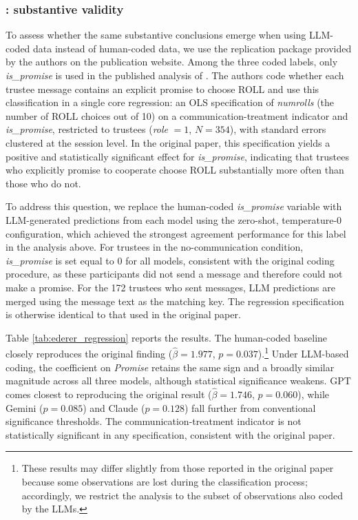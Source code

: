 \documentclass[11pt]{article}
\begin{document}
\begin{sloppypar}


\subsubsection{\citet{ederer_schneider_2022}: substantive validity}

To assess whether the same substantive conclusions emerge when using LLM-coded data instead of human-coded data, we use the replication package provided by the authors on the publication website. Among the three coded labels, only \textit{is\_promise} is used in the published analysis of \citet{ederer_schneider_2022}. The authors code whether each trustee message contains an explicit promise to choose ROLL and use this classification in a single core regression: an \textsc{OLS} specification of \textit{numrolls} (the number of ROLL choices out of 10) on a communication-treatment indicator and \textit{is\_promise}, restricted to trustees (\textit{role} $= 1$, $N = 354$), with standard errors clustered at the session level. In the original paper, this specification yields a positive and statistically significant effect for \textit{is\_promise}, indicating that trustees who explicitly promise to cooperate choose ROLL substantially more often than those who do not.

To address this question, we replace the human-coded \textit{is\_promise} variable with LLM-generated predictions from each model using the zero-shot, temperature-$0$ configuration, which achieved the strongest agreement performance for this label in the analysis above. For trustees in the no-communication condition, \textit{is\_promise} is set equal to 0 for all models, consistent with the original coding procedure, as these participants did not send a message and therefore could not make a promise. For the 172 trustees who sent messages, LLM predictions are merged using the message text as the matching key. The regression specification is otherwise identical to that used in the original paper.

Table \ref{tab:ederer_regression} reports the results. The human-coded baseline closely reproduces the original finding ($\hat{\beta} = 1.977$, $p = 0.037$).\footnote{These results may differ slightly from those reported in the original paper because some observations are lost during the classification process; accordingly, we restrict the analysis to the subset of observations also coded by the LLMs.} Under LLM-based coding, the coefficient on \textit{Promise} retains the same sign and a broadly similar magnitude across all three models, although statistical significance weakens. GPT comes closest to reproducing the original result ($\hat{\beta} = 1.746$, $p = 0.060$), while Gemini ($p = 0.085$) and Claude ($p = 0.128$) fall further from conventional significance thresholds. The communication-treatment indicator is not statistically significant in any specification, consistent with the original paper.


\end{sloppypar}
\end{document}

